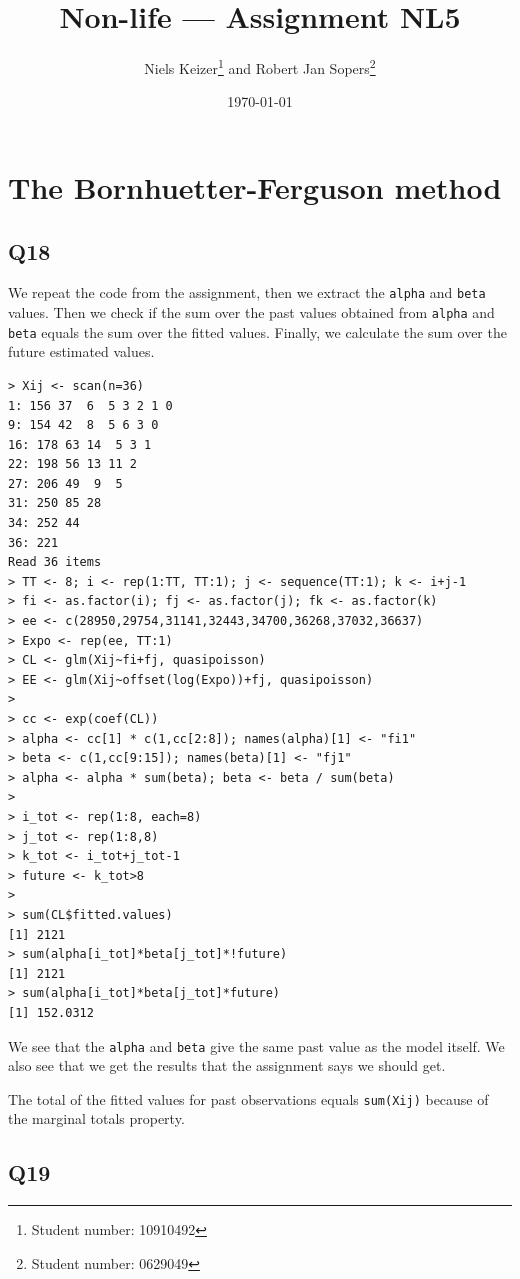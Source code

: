 \documentclass[11pt]{article}
\title{Non-life --- Assignment NL5}  %
\author{
  Niels Keizer\footnote{Student number: 10910492}
  \quad and \quad
  Robert Jan Sopers\footnote{Student number: 0629049}
}
\date{\today}
\begin{document}
\maketitle


\section{The Bornhuetter-Ferguson method}

\subsection*{Q18}

We repeat the code from the assignment, then we extract the \verb|alpha| and \verb|beta| values. Then we check if the sum over the past values obtained from \verb|alpha| and \verb|beta| equals the sum over the fitted values. Finally, we calculate the sum over the future estimated values.

\begin{verbatim}
> Xij <- scan(n=36)
1: 156 37  6  5 3 2 1 0
9: 154 42  8  5 6 3 0
16: 178 63 14  5 3 1
22: 198 56 13 11 2
27: 206 49  9  5
31: 250 85 28
34: 252 44
36: 221
Read 36 items
> TT <- 8; i <- rep(1:TT, TT:1); j <- sequence(TT:1); k <- i+j-1
> fi <- as.factor(i); fj <- as.factor(j); fk <- as.factor(k)
> ee <- c(28950,29754,31141,32443,34700,36268,37032,36637)
> Expo <- rep(ee, TT:1)
> CL <- glm(Xij~fi+fj, quasipoisson)
> EE <- glm(Xij~offset(log(Expo))+fj, quasipoisson)
> 
> cc <- exp(coef(CL))
> alpha <- cc[1] * c(1,cc[2:8]); names(alpha)[1] <- "fi1"
> beta <- c(1,cc[9:15]); names(beta)[1] <- "fj1"
> alpha <- alpha * sum(beta); beta <- beta / sum(beta)
> 
> i_tot <- rep(1:8, each=8)
> j_tot <- rep(1:8,8)
> k_tot <- i_tot+j_tot-1
> future <- k_tot>8
> 
> sum(CL$fitted.values)
[1] 2121
> sum(alpha[i_tot]*beta[j_tot]*!future)
[1] 2121
> sum(alpha[i_tot]*beta[j_tot]*future)
[1] 152.0312
\end{verbatim}

We see that the \verb|alpha| and \verb|beta| give the same past value as the model itself. We also see that we get the results that the assignment says we should get.

The total of the fitted values for past observations equals \verb|sum(Xij)| because of the marginal totals property.

\subsection*{Q19}
\end{document}
